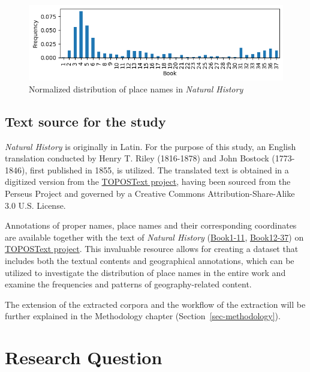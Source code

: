 \documentclass[
  12pt,
]{article}
\begin{document}
\begin{figure}

{\centering \includegraphics{NHthesis_structure_files/figure-pdf/fig-place_distribution-output-1.png}

}

\caption{\label{fig-place_distribution}Normalized distribution of place
names in \emph{Natural History}}

\end{figure}

\hypertarget{text-source-for-the-study}{%
\subsection{Text source for the study}\label{text-source-for-the-study}}

\emph{Natural History} is originally in Latin. For the purpose of this
study, an English translation conducted by Henry T. Riley (1816-1878)
and John Bostock (1773-1846), first published in 1855, is utilized. The
translated text is obtained in a digitized version from the
\href{https://topostext.org/the-project}{TOPOSText project}, having been
sourced from the Perseus Project and governed by a Creative Commons
Attribution-Share-Alike 3.0 U.S. License.

Annotations of proper names, place names and their corresponding
coordinates are available together with the text of \emph{Natural
History} (\href{https://topostext.org/work/148}{Book1-11},
\href{https://topostext.org/work/153}{Book12-37}) on
\href{https://topostext.org/the-project}{TOPOSText project}. This
invaluable resource allows for creating a dataset that includes both the
textual contents and geographical annotations, which can be utilized to
investigate the distribution of place names in the entire work and
examine the frequencies and patterns of geography-related content.

The extension of the extracted corpora and the workflow of the
extraction will be further explained in the Methodology chapter
(Section~\ref{sec-methodology}).

\hypertarget{sec-research_question}{%
\section{Research Question}\label{sec-research_question}}
\end{document}
